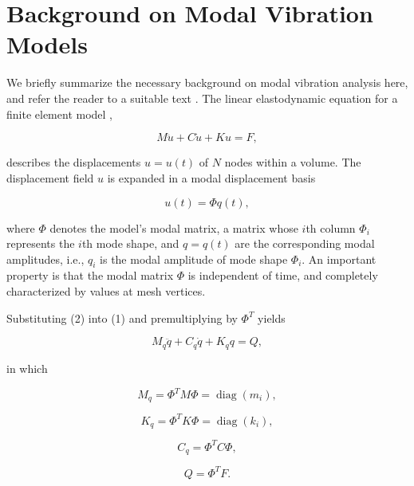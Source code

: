 \documentclass[12pt]{article}
\begin{document}
\section{Background on Modal Vibration Models}

We briefly summarize the necessary background on modal vibration analysis here, and refer the reader to a suitable text \cite{shabana1990theory}. The linear elastodynamic equation for a finite element model \cite{zienkiewicz1977finite},

\begin{equation}
    M\ddot{u} + C\dot{u} + Ku = F, \tag{1}
\end{equation}

describes the displacements $u=u(t)$ of $N$ nodes within a volume. The displacement field $u$ is expanded in a modal displacement basis

\begin{equation}
    u(t) = \Phi q(t), \tag{2}
\end{equation}

where $\Phi$ denotes the model's modal matrix, a matrix whose $i$th column $\Phi_i$ represents the $i$th mode shape, and $q = q(t)$ are the corresponding modal amplitudes, i.e., $q_i$ is the modal amplitude of mode shape $\Phi_i$. An important property is that the modal matrix $\Phi$ is independent of time, and completely characterized by values at mesh vertices.

Substituting (2) into (1) and premultiplying by $\Phi^T$ yields

\begin{equation}
    M_q \ddot{q} + C_q \dot{q} + K_q q = Q, \tag{3}
\end{equation}

in which

\begin{equation}
    M_q = \Phi^T M \Phi = \operatorname{diag}(m_i), \tag{4}
\end{equation}

\begin{equation}
    K_q = \Phi^T K \Phi = \operatorname{diag}(k_i), \tag{5}
\end{equation}

\begin{equation}
    C_q = \Phi^T C \Phi, \tag{6}
\end{equation}

\begin{equation}
    Q = \Phi^T F. \tag{7}
\end{equation}
\end{document}
